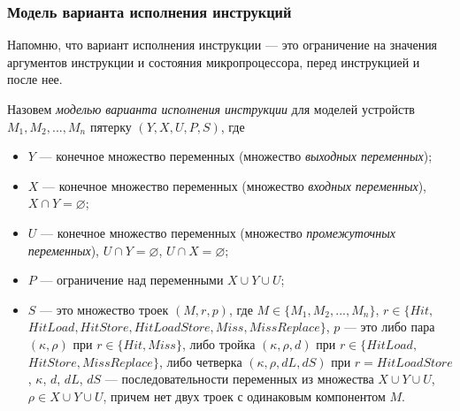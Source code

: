 %




\subsubsection*{Модель варианта исполнения инструкций}

Напомню, что вариант исполнения инструкции --- это ограничение на значения аргументов инструкции и состояния микропроцессора, перед инструкцией и после нее.



Назовем \emph{моделью варианта исполнения инструкции} для моделей устройств $M_1, M_2, ..., M_n$ пятерку $(Y, X, U, P, S)$, где
  \begin{itemize}
    \item $Y$ --- конечное множество переменных (множество \emph{выходных переменных});
    \item $X$ --- конечное множество переменных (множество \emph{входных переменных}), $X \cap Y = \varnothing$;
    \item $U$ --- конечное множество переменных (множество \emph{промежуточных переменных}), $U \cap Y = \varnothing$, $U \cap X = \varnothing$;
    \item $P$ --- ограничение над переменными $X \cup Y \cup U$;
    \item $S$ --- это множество троек $(M, r, p)$, где $M \in \{M_1, M_2, ..., M_n\}$, $r \in \{Hit,$ $HitLoad, HitStore, HitLoadStore, Miss, MissReplace\}$, $p$ --- это либо пара $(\kappa, \rho)$ при $r \in \{Hit, Miss\}$, либо тройка $(\kappa, \rho, d)$ при $r \in \{HitLoad,$ $HitStore, MissReplace\}$, либо четверка $(\kappa, \rho, dL, dS)$ при $r = HitLoadStore$, $\kappa$, $d$, $dL$, $dS$ --- последовательности переменных из множества $X \cup Y \cup U$, $\rho \in X \cup Y \cup U$, причем нет двух троек с одинаковым компонентом $M$.
  \end{itemize}

